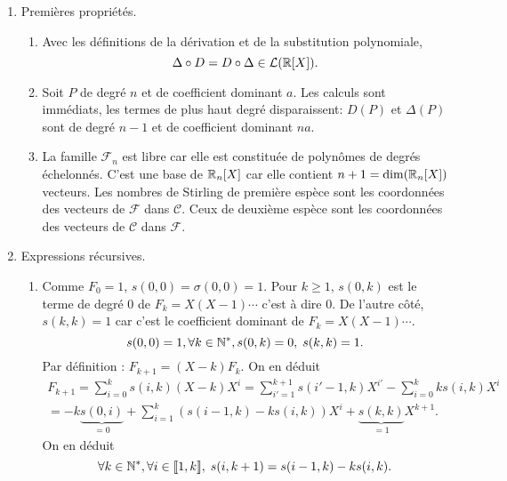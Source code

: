 \begin{enumerate}
 \item Premières propriétés.
 \begin{enumerate}
  \item Avec les définitions de la dérivation et de la substitution polynomiale,
\[
 \Delta \circ D = D \circ \Delta \in \mathcal{L}(\mathbb{R}[X]).
\]

  \item Soit $P$ de degré $n$ et de coefficient dominant $a$. Les calculs sont immédiats, les termes de plus haut degré disparaissent: $D(P)$ et $\Delta(P)$ sont de degré $n-1$ et de coefficient dominant $na$.
  
  \item La famille $\mathcal{F}_n$ est libre car elle est constituée de polynômes de degrés échelonnés. C'est une base de $\mathbb{R}_n[X]$ car elle contient $n+1 = \dim (\mathbb{R}_n[X])$ vecteurs.\newline
  Les nombres de Stirling de première espèce sont les coordonnées des vecteurs de $\mathcal{F}$ dans $\mathcal{C}$. Ceux de deuxième espèce sont les coordonnées des vecteurs de $\mathcal{C}$ dans $\mathcal{F}$.
 \end{enumerate}

 \item Expressions récursives.
 \begin{enumerate}
  \item Comme $F_0 = 1$, $s(0,0) = \sigma(0,0) = 1$.\newline
  Pour $k\geq1$, $s(0,k)$ est le terme de degré $0$ de $F_k = X(X-1)\cdots$ c'est à dire $0$. De l'autre côté, $s(k,k)=1$ car c'est le coefficient dominant de $F_k = X(X-1)\cdots$.
  \[
   s(0,0) = 1, \forall k \in \mathbb{N}^*, s(0,k) = 0, \; s(k,k) = 1.
  \]
Par définition : $F_{k+1} = (X-k)F_k$. On en déduit
\begin{multline*}
 F_{k+1} = \sum_{i=0}^{k}s(i,k)(X-k)X^i
 = \sum_{i'=1}^{k+1}s(i'-1,k)X^{i'} - \sum_{i=0}^{k}ks(i,k)X^i \\
 = -k\underset{= 0}{\underbrace{s(0,i)}} + \sum_{i = 1}^{k}\left(s(i-1,k) - ks(i,k) \right) X^i + \underset{= 1}{\underbrace{s(k,k)}}X^{k+1}. 
\end{multline*}
On en déduit
\[
 \forall k \in \mathbb{N}^*, \forall i \in \llbracket 1,k \rrbracket, \; s(i,k+1) = s(i-1,k) - ks(i,k).
\]


\end{enumerate}
\end{enumerate}
